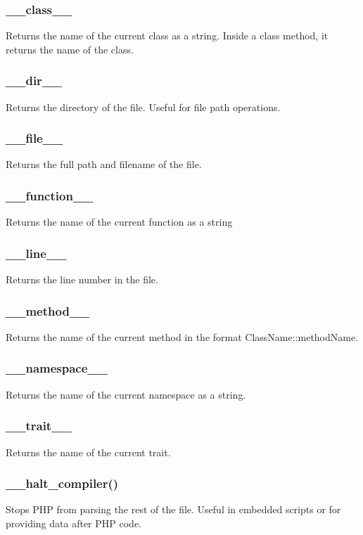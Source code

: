 \documentclass{report}
\begin{document}
    \subsubsection{\_\_class\_\_}
    \bigbreak \noindent 
    Returns the name of the current class as a string. Inside a class method, it returns the name of the class.
    \subsubsection{\_\_dir\_\_}
    \bigbreak \noindent 
    Returns the directory of the file. Useful for file path operations.
    \bigbreak \noindent 
    \subsubsection{\_\_file\_\_}
    \bigbreak \noindent 
    Returns the full path and filename of the file.
    \bigbreak \noindent 
    \subsubsection{\_\_function\_\_}
    \bigbreak \noindent 
    Returns the name of the current function as a string
    \bigbreak \noindent 
    \subsubsection{\_\_line\_\_}
    \bigbreak \noindent 
    Returns the line number in the file.
    \bigbreak \noindent 
    \subsubsection{\_\_method\_\_}
    \bigbreak \noindent 
    Returns the name of the current method in the format ClassName::methodName.
    \bigbreak \noindent 
    \subsubsection{\_\_namespace\_\_}
    \bigbreak \noindent 
    Returns the name of the current namespace as a string.
    \bigbreak \noindent 
    \subsubsection{\_\_trait\_\_}
    \bigbreak \noindent 
    Returns the name of the current trait.
    \bigbreak \noindent 
    \subsubsection{\_\_halt\_compiler()}
    \bigbreak \noindent 
    Stops PHP from parsing the rest of the file. Useful in embedded scripts or for providing data after PHP code.
\end{document}
